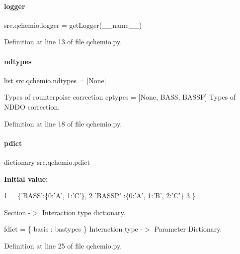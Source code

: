 \paragraph{\texorpdfstring{logger}{logger}}
{\footnotesize\ttfamily src.\+qchemio.\+logger = get\+Logger(\+\_\+\+\_\+name\+\_\+\+\_\+)}



Definition at line 13 of file qchemio.\+py.

\mbox{\label{namespacesrc_1_1qchemio_a50bb8a1c1f0a033941377d8ff121529b}} 
\paragraph{\texorpdfstring{ndtypes}{ndtypes}}
{\footnotesize\ttfamily list src.\+qchemio.\+ndtypes = \mbox{[}None\mbox{]}}



Types of counterpoise correction cptypes = \mbox{[}None, \textquotesingle{}B\+A\+SS\textquotesingle{}, \textquotesingle{}B\+A\+S\+SP\textquotesingle{}\mbox{]} Types of N\+D\+DO correction. 



Definition at line 18 of file qchemio.\+py.

\mbox{\label{namespacesrc_1_1qchemio_a360e0e02d18612db04a126c58afde31b}} 
\paragraph{\texorpdfstring{pdict}{pdict}}
{\footnotesize\ttfamily dictionary src.\+qchemio.\+pdict}

{\bfseries Initial value\+:}
\begin{DoxyCode}
1 =  \{\textcolor{stringliteral}{'BASS'}:\{0:\textcolor{stringliteral}{'A'}, 1:\textcolor{stringliteral}{'C'}\},
2          \textcolor{stringliteral}{'BASSP'} :\{0:\textcolor{stringliteral}{'A'}, 1:\textcolor{stringliteral}{'B'}, 2:\textcolor{stringliteral}{'C'}\}
3          \}
\end{DoxyCode}


Section -\/$>$ Interaction type dictionary. 

fdict = \{ \textquotesingle{}basis\textquotesingle{} \+: bastypes \} Interaction type -\/$>$ Parameter Dictionary. 

Definition at line 25 of file qchemio.\+py.

